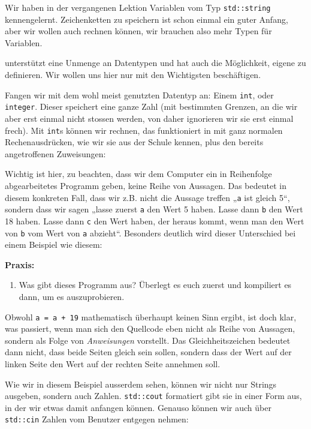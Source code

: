 
Wir haben in der vergangenen Lektion Variablen vom Typ \texttt{std::string}
kennengelernt. Zeichenketten zu speichern ist schon einmal ein guter Anfang,
aber wir wollen auch rechnen können, wir brauchen also mehr Typen für
Variablen.

\Cpp unterstützt eine Unmenge an Datentypen und hat auch die Möglichkeit,
eigene zu definieren. Wir wollen uns hier nur mit den Wichtigsten beschäftigen.

Fangen wir mit dem wohl meist genutzten Datentyp an: Einem \texttt{int}, oder
\texttt{integer}. Dieser speichert eine ganze Zahl (mit bestimmten Grenzen, an
die wir aber erst einmal nicht stossen werden, von daher ignorieren wir sie
erst einmal frech). Mit \texttt{int}s können wir rechnen, das funktioniert in
\Cpp mit ganz normalen Rechenausdrücken, wie wir sie aus der Schule kennen,
plus den bereits angetroffenen Zuweisungen:


Wichtig ist hier, zu beachten, dass wir dem Computer ein in Reihenfolge
abgearbeitetes Programm geben, keine Reihe von Aussagen. Das bedeutet in diesem
konkreten Fall, dass wir z.B. nicht die Aussage treffen „\texttt{a} ist gleich
5“, sondern dass wir sagen „lasse zuerst \texttt{a} den Wert 5 haben. Lasse
dann \texttt{b} den Wert 18 haben. Lasse dann \texttt{c} den Wert haben, der
heraus kommt, wenn man den Wert von \texttt{b} vom Wert von \texttt{a}
abzieht“. Besonders deutlich wird dieser Unterschied bei einem Beispiel wie
diesem:


\textbf{Praxis:}
\begin{enumerate}
    \item Was gibt dieses Programm aus? Überlegt es euch zuerst und kompiliert
        es dann, um es auszuprobieren.
\end{enumerate}

Obwohl \texttt{a = a + 19} mathematisch überhaupt keinen Sinn ergibt, ist doch
klar, was passiert, wenn man sich den Quellcode eben nicht als Reihe von
Aussagen, sondern als Folge von \emph{Anweisungen} vorstellt. Das
Gleichheitszeichen bedeutet dann nicht, dass beide Seiten gleich sein sollen,
sondern dass der Wert auf der linken Seite den Wert auf der rechten Seite
annehmen soll.

Wie wir in diesem Beispiel ausserdem sehen, können wir nicht nur Strings
ausgeben, sondern auch Zahlen. \texttt{std::cout} formatiert gibt sie in einer
Form aus, in der wir etwas damit anfangen können. Genauso können wir auch über
\texttt{std::cin} Zahlen vom Benutzer entgegen nehmen:

